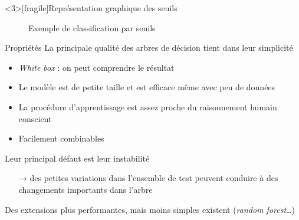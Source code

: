 \documentclass[hyperref={unicode}, xcolor={svgnames}, french]{beamer}
\begin{document}
\begin{frame}<3>[fragile]{Représentation graphique des seuils}
    \begin{figure}
        \tikzset{external/export=true}
        \caption{Exemple de classification par seuils}
    \end{figure}
\end{frame}

\begin{frame}{Propriétés}
    La principale qualité des arbres de décision tient dans leur simplicité
    \begin{itemize}
        \item \emph{White box} : on peut comprendre le résultat
        \item Le modèle est de petite taille et est efficace même avec peu de données
        \item La procédure d'apprentissage est assez proche du raisonnement humain conscient
        \item Facilement combinables
    \end{itemize}
    Leur principal défaut est leur instabilité
    \begin{itemize}
        \item[→] des petites variations dans l'ensemble de test peuvent conduire à des changements importants dans l'arbre
    \end{itemize}
    Des extensions plus performantes, mais moins simples existent (\emph{random forest}…)
\end{frame}
\end{document}
